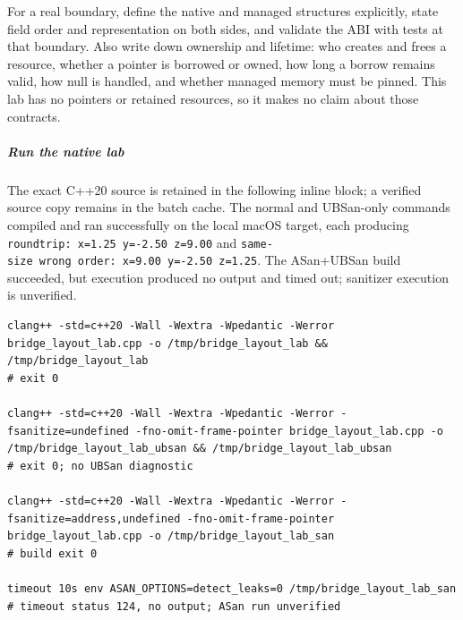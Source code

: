 For a real boundary, define the native and managed structures explicitly, state field order and representation on both sides, and validate the ABI with tests at that boundary. Also write down ownership and lifetime: who creates and frees a resource, whether a pointer is borrowed or owned, how long a borrow remains valid, how null is handled, and whether managed memory must be pinned. This lab has no pointers or retained resources, so it makes no claim about those contracts.

\subparagraph{Run the native lab}\label{06-engine-ii-ch040-run-the-native-lab}

\hypertarget{06-engine-ii-ch040-run-the-native-lab}{}

The exact C++20 source is retained in the following inline block; a verified source copy remains in the batch cache. The normal and UBSan-only commands compiled and ran successfully on the local macOS target, each producing \texttt{roundtrip:\ x=1.25\ y=-2.50\ z=9.00} and \texttt{same-size\ wrong\ order:\ x=9.00\ y=-2.50\ z=1.25}. The ASan+UBSan build succeeded, but execution produced no output and timed out; sanitizer execution is unverified.

\begin{verbatim}
clang++ -std=c++20 -Wall -Wextra -Wpedantic -Werror bridge_layout_lab.cpp -o /tmp/bridge_layout_lab && /tmp/bridge_layout_lab
# exit 0

clang++ -std=c++20 -Wall -Wextra -Wpedantic -Werror -fsanitize=undefined -fno-omit-frame-pointer bridge_layout_lab.cpp -o /tmp/bridge_layout_lab_ubsan && /tmp/bridge_layout_lab_ubsan
# exit 0; no UBSan diagnostic

clang++ -std=c++20 -Wall -Wextra -Wpedantic -Werror -fsanitize=address,undefined -fno-omit-frame-pointer bridge_layout_lab.cpp -o /tmp/bridge_layout_lab_san
# build exit 0

timeout 10s env ASAN_OPTIONS=detect_leaks=0 /tmp/bridge_layout_lab_san
# timeout status 124, no output; ASan run unverified
\end{verbatim}

